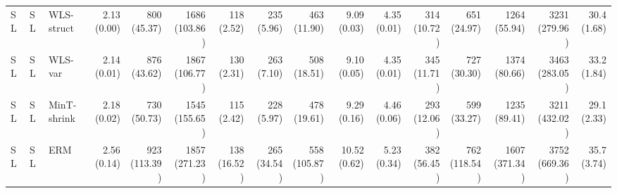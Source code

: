\documentclass[preprint, 3p, times, twocolumn]{elsarticle}
\begin{document}
\begin{table}
\begin{center}
{{\begin{tabular}{l l l rrrrrrrrrrrrr}
  \hspace{0.1cm} 	SL	&SL	&WLS-struct	&2.13 (0.00)	&800 (45.37)	&1686 (103.86)	&118 (2.52)	&235 (5.96)	&463 (11.90)	&9.09 (0.03)	&4.35 (0.01)	&314 (10.72)	&651 (24.97)	&1264 (55.94)	&3231 (279.96)	&30.4 (1.68)	\\
  \hspace{0.1cm} 	SL	&SL	&WLS-var	&2.14 (0.01)	&876 (43.62)	&1867 (106.77)	&130 (2.31)	&263 (7.10)	&508 (18.51)	&9.10 (0.05)	&4.35 (0.01)	&345 (11.71)	&727 (30.30)	&1374 (80.66)	&3463 (283.05)	&33.2 (1.84)	\\
  \hspace{0.1cm} 	SL	&SL	&MinT-shrink	&2.18 (0.02)	&730 (50.73)	&1545 (155.65)	&115 (2.42)	&228 (5.97)	&478 (19.61)	&9.29 (0.16)	&4.46 (0.06)	&293 (12.06)	&599 (33.27)	&1235 (89.41)	&3211 (432.02)	&29.1 (2.33)	\\
  \hspace{0.1cm} 	SL	&SL	&ERM	&2.56 (0.14)	&923 (113.39)	&1857 (271.23)	&138 (16.52)	&265 (34.54)	&558 (105.87)	&10.52 (0.62)	&5.23 (0.34)	&382 (56.45)	&762 (118.54)	&1607 (371.34)	&3752 (669.36)	&35.7 (3.74)	\\
  
  \bottomrule
  
\end{tabular}}}
  \end{center}
  \end{table}
\end{document}

